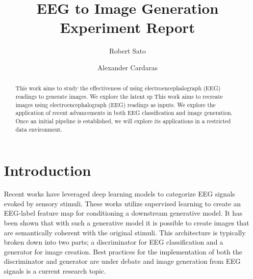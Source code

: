 \documentclass[sigplan,screen]{acmart}
\begin{document}
\title{EEG to Image Generation Experiment Report}


\author{Robert Sato}
\author{Alexander Cardaras}
\authornotemark[1]

\begin{abstract}
  This work aims to study the effectiveness of using electroencephalograph (EEG) readings to generate images. We explore the latent sp
  This work aims to recreate images using electroencephalograph (EEG) readings as inputs. We explore the application of recent advancements in both EEG classification and image generation. Once an initial pipeline is established, we will explore its applications in a restricted data environment.
\end{abstract}





\maketitle

\section{Introduction}
Recent works have leveraged deep learning models to categorize EEG signals evoked by sensory stimuli. These works utilize supervised learning to create an EEG-label feature map for conditioning a downstream generative model. It has been shown that with such a generative model it is possible to create images that are semantically coherent with the original stimuli. This architecture is typically broken down into two parts; a discriminator for EEG classification and a generator for image creation. Best practices for the implementation of both the discriminator and generator are under debate and image generation from EEG signals is a current research topic.
\end{document}
